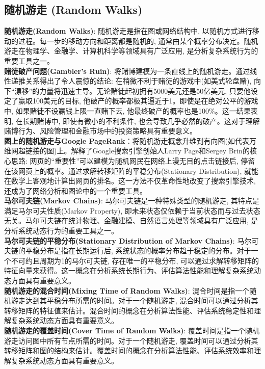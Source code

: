 \documentclass[12pt, a4paper, UTF8]{ctexart}
\newcommand{\term}[1]{\textbf{\textcolor{blue!80!black}{#1}}}
\newcommand{\emphb}[1]{\textbf{#1}}
\begin{document}
\begin{sloppypar}
    \subsection{随机游走 (Random Walks)}
    \term{随机游走(Random Walks)}: 随机游走是指在图或网络结构中, 以随机方式进行移动的过程。每一步的移动方向和距离都是随机的, 通常由某个概率分布决定。随机游走在物理学、金融学、计算机科学等领域具有广泛应用, 是分析复杂系统行为的重要工具之一。\\
    \emphb{赌徒破产问题(Gambler's Ruin)}: 将赌博建模为一条直线上的随机游走。通过线性递推关系得出了令人震惊的结论: 在稍微不利于赌徒的游戏中(如美式轮盘赌), 向下“漂移”的力量将迅速主导。无论赌徒起初拥有5000美元还是50亿美元, 只要他设定了赢取100美元的目标, 他破产的概率都极其逼近于1。即使是在绝对公平的游戏中, 如果赌徒不设赢钱上限一直赌下去, 他最终破产的概率也是100\%。这一结果表明, 在长期赌博中, 即使有微小的不利条件, 也会导致几乎必然的破产。这对于理解赌博行为、风险管理和金融市场中的投资策略具有重要意义。\\
    \emphb{图上的随机游走与Google PageRank}：将随机游走概念升维到有向图(如代表万维网超链接的图)上。解释了Google搜索引擎创始人Larry Page和Sergey Brin的核心思路: 网页的“重要性”可以建模为随机网民在网络上漫无目的点击链接后, 停留在该网页上的概率。通过求解转移矩阵的平稳分布(Stationary Distribution), 就能在数学上客观地计算出网页的排名。这一方法不仅革命性地改变了搜索引擎技术, 还成为了网络分析和图论中的一个重要工具。\\
    \term{马尔可夫链(Markov Chains)}: 马尔可夫链是一种特殊类型的随机游走, 其特点是满足马尔可夫性质(Markov Property), 即未来状态仅依赖于当前状态而与过去状态无关。马尔可夫链在统计物理、金融建模、自然语言处理等领域具有广泛应用, 是分析系统动态行为的重要工具之一。\\
    \emphb{马尔可夫链的平稳分布(Stationary Distribution of Markov Chains)}: 马尔可夫链的平稳分布是指在长期运行后, 系统状态的概率分布趋于稳定的分布。对于一个不可约且周期为1的马尔可夫链, 存在唯一的平稳分布, 可以通过求解转移矩阵的特征向量来获得。这一概念在分析系统长期行为、评估算法性能和理解复杂系统动态方面具有重要意义。\\
    \emphb{随机游走的混合时间(Mixing Time of Random Walks)}: 混合时间是指一个随机游走达到其平稳分布所需的时间。对于一个随机游走, 混合时间可以通过分析其转移矩阵的特征值来估计。混合时间的概念在分析算法性能、评估系统稳定性和理解复杂系统动态方面具有重要意义。\\
    \emphb{随机游走的覆盖时间(Cover Time of Random Walks)}: 覆盖时间是指一个随机游走访问图中所有节点所需的时间。对于一个随机游走, 覆盖时间可以通过分析其转移矩阵和图的结构来估计。覆盖时间的概念在分析算法性能、评估系统效率和理解复杂系统动态方面具有重要意义。
    \newpage


\end{sloppypar}
\end{document}
